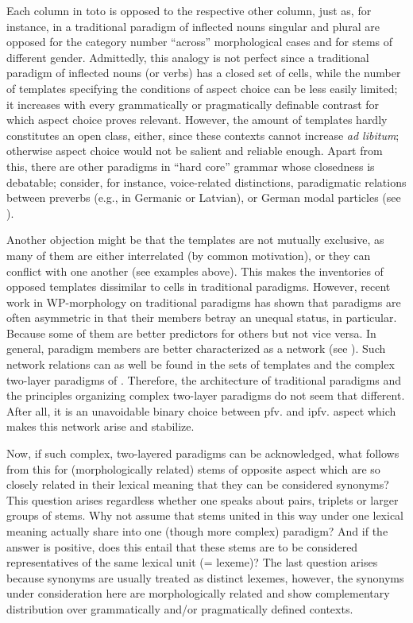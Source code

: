 \documentclass[output=paper]{langscibook}
\begin{document}
Each column in toto is opposed to the respective other column, just as, for instance, in a traditional paradigm of inflected nouns singular and plural are opposed for the category number “across” morphological cases and for stems of different gender. Admittedly, this analogy is not perfect since a traditional paradigm of inflected nouns (or verbs) has a closed set of cells, while the number of templates specifying the conditions of aspect choice can be less easily limited; it increases with every grammatically or pragmatically definable contrast for which aspect choice proves relevant. However, the amount of templates hardly constitutes an open class, either, since these contexts cannot increase \textit{ad libitum}; otherwise aspect choice would not be salient and reliable enough. Apart from this, there are other paradigms in “hard core” grammar whose closedness is debatable; consider, for instance, voice-related distinctions, paradigmatic relations between preverbs (e.g., in Germanic or Latvian), or German modal particles (see ).

Another objection might be that the templates are not mutually exclusive, as many of them are either interrelated (by common motivation), or they can conflict with one another (see examples above). This makes the inventories of opposed templates dissimilar to cells in traditional paradigms. However, recent work in WP-morphology on traditional paradigms has shown that paradigms are often asymmetric in that their members betray an unequal status, in particular. Because some of them are better predictors for others but not vice versa. In general, paradigm members are better characterized as a network (see ). Such network relations can as well be found in the sets of templates and the complex two-layer paradigms of . Therefore, the architecture of traditional paradigms and the principles organizing complex two-layer paradigms do not seem that different. After all, it is an unavoidable binary choice between pfv. and ipfv. aspect which makes this network arise and stabilize.

Now, if such complex, two-layered paradigms can be acknowledged, what follows from this for (morphologically related) stems of opposite aspect which are so closely related in their lexical meaning that they can be considered synonyms? This question arises regardless whether one speaks about pairs, triplets or larger groups of stems. Why not assume that stems united in this way under one lexical meaning actually share into one (though more complex) paradigm? And if the answer is positive, does this entail that these stems are to be considered representatives of the same lexical unit (= lexeme)? The last question arises because synonyms are usually treated as distinct lexemes, however, the synonyms under consideration here are morphologically related and show complementary distribution over grammatically and/or pragmatically defined contexts.\largerpage
\end{document}
